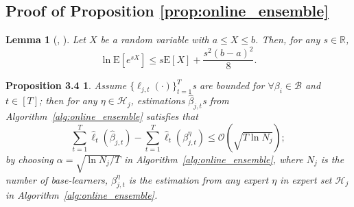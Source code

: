\documentclass{article}
\theoremstyle{plain}
\newtheorem*{proposition34}{Proposition 3.4}
\newtheorem{lemma}[theorem]{Lemma}
\theoremstyle{definition}
\theoremstyle{remark}
\def \sB {\mathcal{B}}
\def \sH {\mathcal{H}}
\begin{document}
 

\subsection{Proof of Proposition \ref{prop:online_ensemble}}
\label{prof:hedge}
\begin{lemma}[\citeauthor{hoeffding1994probability}, \citeyear{hoeffding1994probability}]
  \label{lemma:hoeffding}
  Let $X$ be a random variable with $a \leq X \leq b$. Then, for any $s \in \mathbb{R}$,
\[
\ln \mathrm{E}\left[e^{s X}\right] \leq s \mathrm{E}[X]+\frac{s^2(b-a)^2}{8} .
\]
\end{lemma}

\begin{proposition34}
  Assume $\{\ell_{j, t}(\cdot)\}_{t=1}^T$s are bounded for $\forall \beta_i\in\sB$ and $t\in [T]$;
  then for any $\eta \in \sH_j$, estimations $\hat{\beta}_{j, t}$s from Algorithm~\ref{alg:online_ensemble} satisfies that
  \vskip -0.15in
  \begin{equation*}
    \sum_{t=1}^T \hat{\ell}_t\left(\hat{\beta}_{j, t}\right)-\sum_{t=1}^T \hat{\ell}_t\left(\beta^\eta_{j, t}\right) \leq \mathcal{O}\left(\sqrt{T\ln N_j}\right);
  \end{equation*}
  \vskip -0.1in
  by choosing $\alpha=\sqrt{\ln N_j/T}$ in Algorithm~\ref{alg:online_ensemble}, where $N_j$ is the number of base-learners, $\beta^\eta_{j, t}$ is the estimation from any expert $\eta$ in expert set $\sH_j$ in Algorithm~\ref{alg:online_ensemble}.
\end{proposition34}
\end{document}
